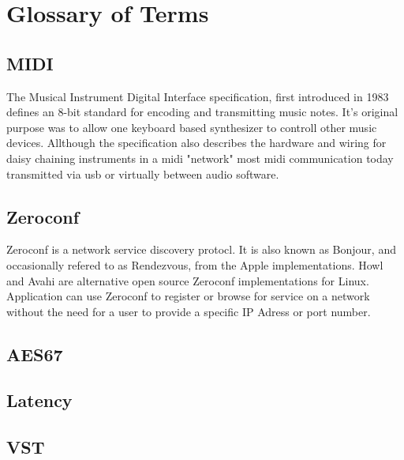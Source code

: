 \section{Glossary of Terms}

\subsection*{MIDI}
The Musical Instrument Digital Interface specification, first introduced in 1983 defines an 8-bit standard for encoding and transmitting music notes. It's original purpose was to allow one keyboard based synthesizer to controll other music devices.\cite{Boulanger:2011} Allthough the specification also describes the hardware and wiring for daisy chaining instruments in a midi "network" most midi communication today transmitted via usb or virtually between audio software.

\subsection*{Zeroconf}
Zeroconf is a network service discovery protocl. It is also known as Bonjour, and occasionally refered to as Rendezvous, from the Apple implementations. Howl and Avahi are alternative open source Zeroconf implementations for Linux. Application can use Zeroconf to register or browse for service on a network without the need for a user to provide a specific IP Adress or port number. \cite{zeroconf}

\subsection*{AES67}

\subsection*{Latency}

\subsection*{VST}